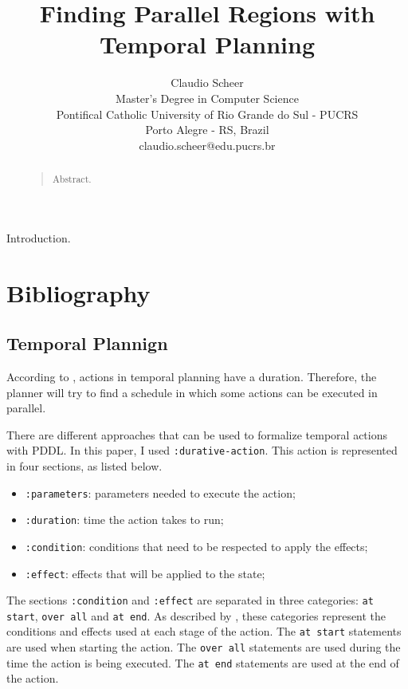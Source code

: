 \documentclass[letterpaper]{article}
\begin{document}
\title{Finding Parallel Regions with Temporal Planning}
\author{Claudio Scheer\\
    Master's Degree in Computer Science\\
    Pontifical Catholic University of Rio Grande do Sul - PUCRS\\
    Porto Alegre - RS, Brazil\\
    claudio.scheer@edu.pucrs.br\\
}
\maketitle

\begin{abstract}
    \begin{quote}
        Abstract.
    \end{quote}
\end{abstract}

\noindent Introduction.


\section{Bibliography}

\subsection{Temporal Plannign} \label{label:temporal-planning}

According to \cite{DBLP:series/synthesis/2019Haslum}, actions in temporal planning have a duration. Therefore, the planner will try to find a schedule in which some actions can be executed in parallel.

There are different approaches that can be used to formalize temporal actions with PDDL. In this paper, I used \texttt{:durative-action}. This action is represented in four sections, as listed below.

\begin{itemize}
    \item \texttt{:parameters}: parameters needed to execute the action;
    \item \texttt{:duration}: time the action takes to run;
    \item \texttt{:condition}: conditions that need to be respected to apply the effects;
    \item \texttt{:effect}: effects that will be applied to the state;
\end{itemize}

The sections \texttt{:condition} and \texttt{:effect} are separated in three categories: \texttt{at start}, \texttt{over all} and \texttt{at end}. As described by \cite{DBLP:series/synthesis/2019Haslum}, these categories represent the conditions and effects used at each stage of the action. The \texttt{at start} statements are used when starting the action. The \texttt{over all} statements are used during the time the action is being executed. The \texttt{at end} statements are used at the end of the action.
\end{document}
